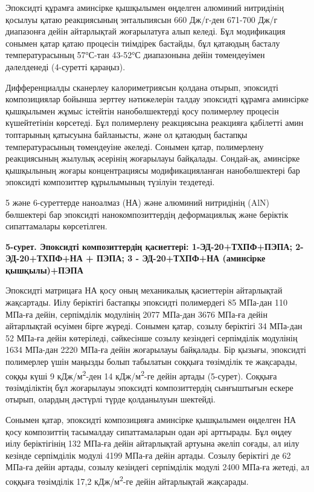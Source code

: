 Эпоксидті құрамға аминсірке қышқылымен өңделген алюминий нитридінің
қосылуы қатаю реакциясының энтальпиясын 660 Дж/г-ден 671-700 Дж/г
диапазонға дейін айтарлықтай жоғарылатуға алып келеді. Бұл модификация
сонымен қатар қатаю процесін тиімдірек бастайды, бұл қатаюдың басталу
температурасының 57°С-тан 43-52°С диапазонына дейін төмендеуімен
дәлелденеді (4-суретті қараңыз).

Дифференциалды сканерлеу калориметриясын қолдана отырып, эпоксидті
композициялар бойынша зерттеу нәтижелерін талдау эпоксидті құрамға
аминсірке қышқылымен жұмыс істейтін нанобөлшектерді қосу полимерлеу
процесін күшейтетінін көрсетеді. Бұл полимерлену реакциясына реакцияға
қабілетті амин топтарының қатысуына байланысты, және ол қатаюдың
бастапқы температурасының төмендеуіне әкеледі. Сонымен қатар,
полимерлену реакциясының жылулық әсерінің жоғарылауы байқалады.
Сондай-ақ, аминсірке қышқылының жоғары концентрациясы модификацияланған
нанобөлшектері бар эпоксидті композиттер құрылымының түзілуін тездетеді.

5 және 6-суреттерде наноалмаз (НА) және алюминий нитридінің (AlN)
бөлшектері бар эпоксидті нанокомпозиттердің деформациялық және беріктік
сипаттамалары көрсетілген.

{\bfseries 5-сурет. Эпоксидті композиттердің қасиеттері: 1-ЭД-20+ТХПФ+ПЭПА;
2-ЭД-20+ТХПФ+НА + ПЭПА; 3 - ЭД-20+ТХПФ+НА (аминсірке}
{\bfseries қышқылы)+ПЭПА}

Эпоксидті матрицаға НА қосу оның механикалық қасиеттерін айтарлықтай
жақсартады. Иілу беріктігі бастапқы эпоксидті полимердегі 85 МПа-дан 110
МПа-ға дейін, серпімділік модулінің 2077 МПа-дан 3676 МПа-ға дейін
айтарлықтай өсуімен бірге жүреді. Сонымен қатар, созылу беріктігі 34
МПа-дан 52 МПа-ға дейін көтеріледі, сәйкесінше созылу кезіндегі
серпімділік модулінің 1634 МПа-дан 2220 МПа-ға дейін жоғарылауы
байқалады. Бір қызығы, эпоксидті полимерлер үшін маңызды болып табылатын
соққыға төзімділік те жақсарады, соққы күші 9
кДж/м\textsuperscript{2}-ден 14 кДж/м\textsuperscript{2}-ге дейін артады
(5-сурет). Соққыға төзімділіктің бұл жоғарылауы эпоксидті композиттердің
сынғыштығын ескере отырып, олардың дәстүрлі түрде қолданылуын шектейді.

Сонымен қатар, эпоксидті композицияға аминсірке қышқылымен өңделген НА
қосу композиттің тасымалдау сипаттамаларын одан әрі арттырады. Бұл өңдеу
иілу беріктігінің 132 МПа-ға дейін айтарлықтай артуына әкеліп соғады, ал
иілу кезінде серпімділік модулі 4199 МПа-ға дейін артады. Созылу
беріктігі де 62 МПа-ға дейін артады, созылу кезіндегі серпімділік модулі
2400 МПа-ға жетеді, ал соққыға төзімділік 17,2
кДж/м\textsuperscript{2}-ге дейін айтарлықтай жақсарады.

